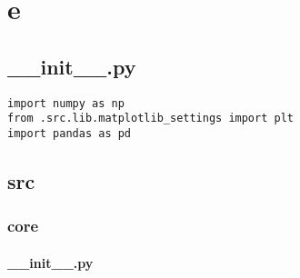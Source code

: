 \chapter{e}\label{apendice:b}

\section{\_\_init\_\_.py}
\begin{verbatim}
import numpy as np
from .src.lib.matplotlib_settings import plt
import pandas as pd
\end{verbatim}


\section{src}

\subsection{core}

\subsubsection{\_\_init\_\_.py}
\begin{verbatim}

\end{verbatim}




